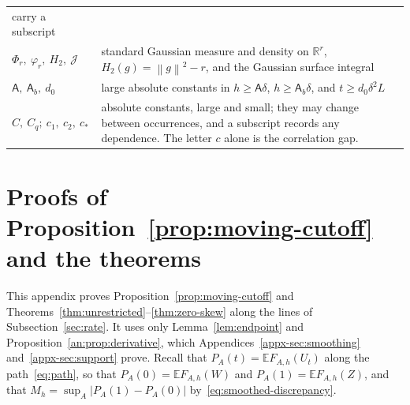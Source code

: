 \documentclass[11pt,letterpaper]{article}
\theoremstyle{remark}
\newcommand{\E}{\mathbb E}
\newcommand{\R}{\mathbb R}
\newcommand{\norm}[1]{\left\lVert#1\right\rVert}
\newcommand{\surf}{\mathcal J}
\begin{document}
\begin{center}
\begin{tabular}{@{}p{}p{}@{}}
carry a subscript\\
\(\Phi_r,\ \varphi_r,\ H_2,\ \surf\) & standard Gaussian measure and
density on \(\R^r\), \(H_2(g)=\norm g^2-r\), and the Gaussian surface
integral\\
\(\mathsf A,\ \mathsf A_b,\ d_0\) & large absolute constants in
\(h\ge\mathsf A\delta\), \(h\ge\mathsf A_b\delta\), and
\(t\ge d_0\delta^2L\)\\
\(C,\ C_q;\ c_1,\ c_2,\ c_*\) & absolute constants, large and small;
they may change between occurrences, and a subscript records any
dependence. The letter \(c\) alone is the correlation gap.\\
\end{tabular}
\end{center}

\section{\texorpdfstring{Proofs of Proposition~\ref{prop:moving-cutoff} and the theorems}{Proofs of Proposition 2 and the theorems}}\label{sec:main-proof}
This appendix proves Proposition~\ref{prop:moving-cutoff} and
Theorems~\ref{thm:unrestricted}--\ref{thm:zero-skew} along the lines of
Subsection~\ref{sec:rate}. It uses only Lemma~\ref{lem:endpoint} and
Proposition~\ref{an:prop:derivative}, which
Appendices~\ref{appx-sec:smoothing} and~\ref{appx-sec:support} prove.
Recall that \(P_A(t)=\E F_{A,h}(U_t)\) along the
path~\eqref{eq:path}, so that \(P_A(0)=\E F_{A,h}(W)\) and
\(P_A(1)=\E F_{A,h}(Z)\), and that
\(M_h=\sup_A|P_A(1)-P_A(0)|\) by~\eqref{eq:smoothed-discrepancy}.
\end{document}
